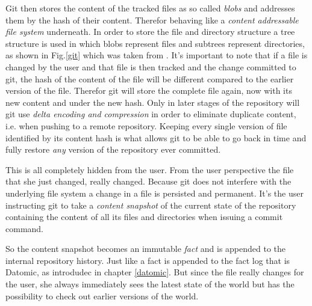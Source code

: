 Git then stores the content of the tracked files as so called
\textit{blobs} and addresses them by the hash of their content.
Therefor behaving like a \textit{content addressable file system}
underneath. In order to store the file and directory structure
a tree structure is used in which blobs represent files and
subtrees represent directories, as shown in Fig.\ref{git} which
was taken from \cite{gitinternals}. It's important to note that
if a file is changed by the user and that file is then tracked
and the change committed to git, the hash of the content of the
file will be different compared to the earlier version of the file.
Therefor git will store the complete file again, now with its
new content and under the new hash. Only in later stages of the
repository will git use \textit{delta encoding and compression}
in order to eliminate duplicate content, i.e. when pushing to
a remote repository.
Keeping every single version of file identified by its content
hash is what allows git to be able to go back in time and fully
restore \textit{any} version of the repository ever committed.

This is all completely hidden from the user. From the user
perspective the file that she just changed, really changed.
Because git does not interfere with the underlying file system
a change in a file is persisted and permanent. It's the user
instructing git to take a \textit{content snapshot} of the current
state of the repository containing the content of all its files
and directories when issuing a commit command.

So the content snapshot becomes an immutable \textit{fact} and is
appended to the internal repository history. Just like a fact is
appended to the fact log that is Datomic, as introdudec in chapter
\ref{datomic}. But since the file really changes for the user,
she always immediately sees the latest state of the world but
has the possibility to check out earlier versions of the world.

